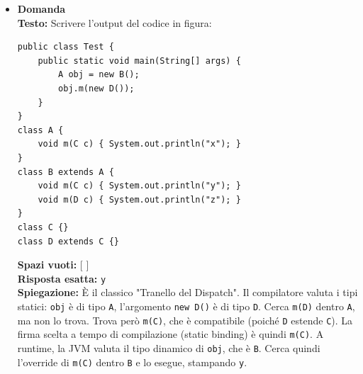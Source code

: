 \documentclass[12pt, a4paper]{article}
\begin{document}
\begin{itemize}
\newpage

    \item {}\textbf{Domanda \thedomanda} \\
    \textbf{Testo:} Scrivere l'output del codice in figura:
\begin{verbatim}
public class Test {
    public static void main(String[] args) {
        A obj = new B();
        obj.m(new D());
    }
}
class A {
    void m(C c) { System.out.println("x"); }
}
class B extends A {
    void m(C c) { System.out.println("y"); }
    void m(D c) { System.out.println("z"); }
}
class C {}
class D extends C {}
\end{verbatim}
    \textbf{Spazi vuoti:} [ \hspace{2cm} ] \\
    \textbf{Risposta esatta:} \texttt{y} \\
    \textbf{Spiegazione:} È il classico "Tranello del Dispatch". Il compilatore valuta i tipi statici: \texttt{obj} è di tipo \texttt{A}, l'argomento \texttt{new D()} è di tipo \texttt{D}. Cerca \texttt{m(D)} dentro \texttt{A}, ma non lo trova. Trova però \texttt{m(C)}, che è compatibile (poiché \texttt{D} estende \texttt{C}). La firma scelta a tempo di compilazione (static binding) è quindi \texttt{m(C)}. A runtime, la JVM valuta il tipo dinamico di \texttt{obj}, che è \texttt{B}. Cerca quindi l'override di \texttt{m(C)} dentro \texttt{B} e lo esegue, stampando \texttt{y}.
    \vspace{0.5cm}

\newpage


\end{itemize}
\end{document}
